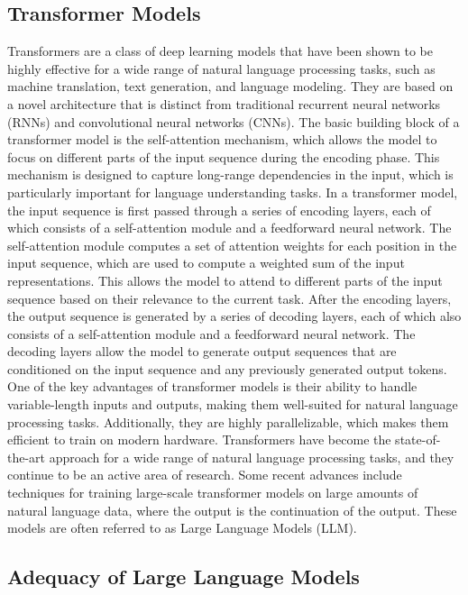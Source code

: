 \subsection{Transformer Models}
\label{subsec:SecondContent:SecondSection}
Transformers are a class of deep learning models that have been shown to be highly effective for a wide range of natural language processing tasks, such as machine translation, text generation, and language modeling. They are based on a novel architecture that is distinct from traditional recurrent neural networks (RNNs) and convolutional neural networks (CNNs).
The basic building block of a transformer model is the self-attention mechanism, which allows the model to focus on different parts of the input sequence during the encoding phase. This mechanism is designed to capture long-range dependencies in the input, which is particularly important for language understanding tasks.
In a transformer model, the input sequence is first passed through a series of encoding layers, each of which consists of a self-attention module and a feedforward neural network. The self-attention module computes a set of attention weights for each position in the input sequence, which are used to compute a weighted sum of the input representations. This allows the model to attend to different parts of the input sequence based on their relevance to the current task.
After the encoding layers, the output sequence is generated by a series of decoding layers, each of which also consists of a self-attention module and a feedforward neural network. The decoding layers allow the model to generate output sequences that are conditioned on the input sequence and any previously generated output tokens.
One of the key advantages of transformer models is their ability to handle variable-length inputs and outputs, making them well-suited for natural language processing tasks. Additionally, they are highly parallelizable, which makes them efficient to train on modern hardware. 	
Transformers have become the state-of-the-art approach for a wide range of natural language processing tasks, and they continue to be an active area of research. Some recent advances include techniques for training large-scale transformer models on large amounts of natural language data, where the output is the continuation of the output. These models are often referred to as Large Language Models (LLM).

\subsection{Adequacy of Large Language Models}
\label{subsec:SecondContent:ThirdSection}

